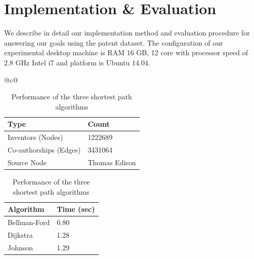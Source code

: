 \section{Implementation \& Evaluation}
\label{sec:eval}

We describe in detail our implementation method and evaluation procedure for
answering  our goals using the patent dataset. The configuration of our
experimental desktop machine is RAM $16$ GB, 12 core with processor speed of
$2.8$ GHz Intel i7 and platform is Ubuntu $14.04$.

\begin{table}[H] 
	\scriptsize
  \begin{tabular}{@{}c@{}} 
  \begin{minipage}{0.4\linewidth}
		\begin{center}
	  		\begin{tabular}{| l | l |}
				\hline
				
				{Type} & {Count} \\
				\hline
				\hline
				Inventors (Nodes) & 1222689 \\
				Co-authorships (Edges) & 3431064 \\
				Source Node & Thomas Edison\\
				\hline
			\end{tabular}		
			\caption {\scriptsize Details of the co-authorship graph}
			\label{tab:model}

			\vspace{0.85cm}

			\begin{tabular}{| l | l |}
				\hline
				{Algorithm} & {Time (sec)} \\
				\hline
				\hline
				Bellman-Ford & 0.80 \\
				Dijkstra & 1.28 \\
				Johnson & 1.29 \\
				\hline
			\end{tabular}
			\caption {\scriptsize Performance of the three shortest path algorithms}
			\label{tab:algos}
		\end{center}


\end{minipage}
\end{tabular}
\end{table}
